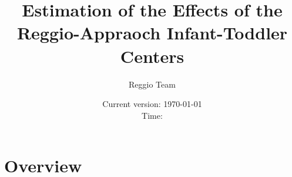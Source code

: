 



\title{Estimation of the Effects of the Reggio-Appraoch Infant-Toddler Centers}
\author{Reggio Team}
\date{Current version: \today \\ \vspace{1em} Time: \currenttime}
\maketitle

\doublespacing

\section{Overview}





